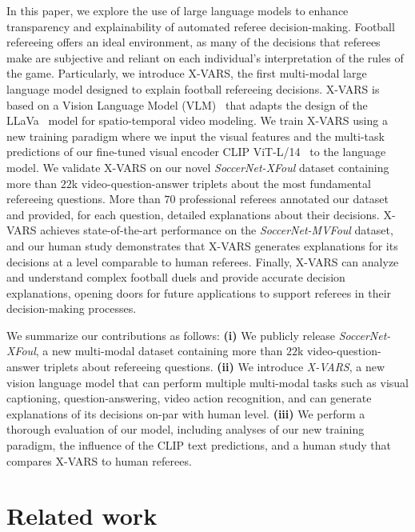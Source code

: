 In this paper, we explore the use of large language models to enhance transparency and explainability of automated referee decision-making. %
Football refereeing offers an ideal environment, as many of the decisions that referees make are subjective and reliant on each individual's interpretation of the rules of the game. 
Particularly, we introduce X-VARS, the first multi-modal large language model designed to explain football refereeing decisions.
X-VARS is based on a Vision Language Model (VLM)~\cite{Maaz2023VideoChatGPT-arxiv} that adapts the design of the LLaVa~\cite{Liu2023Visual-arxiv} model for spatio-temporal video modeling. 
We train X-VARS using a new training paradigm where we input the visual features and the multi-task predictions of our fine-tuned visual encoder CLIP ViT-L/14~\cite{Radford2021Learning} to the language model. 
We validate X-VARS on our novel \textit{SoccerNet-XFoul} dataset containing more than $22$k video-question-answer triplets about the most fundamental refereeing questions. More than $70$ professional referees annotated our dataset and provided, for each question, detailed explanations about their decisions.
X-VARS achieves state-of-the-art performance on the \textit{SoccerNet-MVFoul} dataset, and our human study demonstrates that X-VARS generates explanations for its decisions at a level comparable to human referees. 
Finally, X-VARS can analyze and understand complex football duels and provide accurate decision explanations, opening doors for future applications to support referees in their decision-making processes.

 We summarize our contributions as follows:
\textbf{(i)} We publicly release \textit{SoccerNet-XFoul}, a new multi-modal dataset containing more than $22$k video-question-answer triplets about refereeing questions. 
\textbf{(ii)} We introduce \textit{X-VARS}, a new vision language model that can perform multiple multi-modal tasks such as visual captioning, question-answering, video action recognition, and can generate explanations of its decisions on-par with human level.
\textbf{(iii)} We perform a thorough evaluation of our model, including analyses of our new training paradigm, the influence of the CLIP text predictions, and a human study that compares X-VARS to human referees.

\section{Related work}
\label{sec:related_work}

